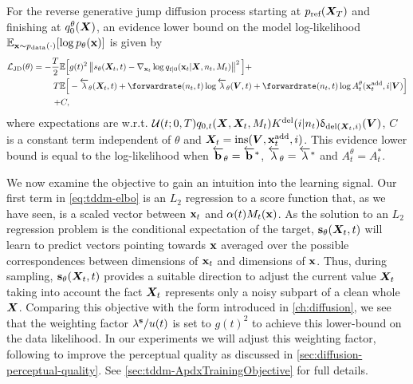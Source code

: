 \begin{proposition}
\label{prop:elbo}
For the reverse generative jump diffusion process starting at $p_{\textup{ref}}({\bm{X}}_T)$ and finishing at $ q_0^\theta({\bm{X}})$, an evidence lower bound on the model log-likelihood $ \mathbb{E}_{{\mathbf{x}} \sim p_{\rm{data}}(\cdot)} [ \log p_\theta({\mathbf{x}}) ]$ is given by
\begin{align}
    \label{eq:tddm-elbo}
    \mathcal{L}_\text{JD}(\theta) = -\frac{T}{2} \mathbb{E}\Big[& g(t)^2 \norm{s_\theta(\mX_t, t) - \nabla_{\rvx_t} \log q_{t|0}(\rvx_t | \mX, n_t, M_t)   }^2 \Big] + \\
    \nonumber
    T \mathbb{E} \Big[& - \backwardrate_\theta(\mX_t, t) + \forwardrate (n_t, t) \log \backwardrate_\theta(\mV, t) + \forwardrate(n_t, t) \log \autonet_{t}^\theta(\xadd_t, i | \mV) \Big] \\
    \nonumber
    + C,
\end{align}
where expectations are w.r.t. $\mathcal{U}(t; 0, T) q_{0,t}({\bm{X}}, {\bm{X}}_t, M_t) K^{\textup{del}}(i | n_t) \updelta_{\textup{del}({\bm{X}}_t, i)} ({\bm{V}})$, $C$ is a constant term independent of $\theta$ and ${\bm{X}}_t = \text{ins}({\bm{V}}, {\mathbf{x}}^{\textup{add}}_t, i)$.
This evidence lower bound is equal to the log-likelihood when $\overleftarrow{\mathbf{b}}_\theta = \overleftarrow{\mathbf{b}}^*$, $\overleftarrow{\lambda}_\theta = \overleftarrow{\lambda}^*$ and $A_t^\theta = A_t^*$.
\end{proposition}

We now examine the objective to gain an intuition into the learning signal.
Our first term in \cref{eq:tddm-elbo} is an $L_2$ regression to a score function that, as we have seen, is a scaled vector between ${\mathbf{x}}_t$ and $\alpha(t) M_t({\mathbf{x}})$. As the solution to an $L_2$ regression problem is the conditional expectation of the target, ${\mathbf{s}}_\theta({\bm{X}}_t, t)$ will learn to predict vectors pointing towards ${\mathbf{x}}$ averaged over the possible correspondences between dimensions of ${\mathbf{x}}_t$ and dimensions of ${\mathbf{x}}$.
Thus, during sampling, ${\mathbf{s}}_\theta({\bm{X}}_t, t)$ provides a suitable direction to adjust the current value ${\bm{X}}_t$ taking into account the fact ${\bm{X}}_t$ represents only a noisy subpart of a clean whole ${\bm{X}}$. Comparing this objective with the form introduced in \cref{ch:diffusion}, we see that the weighting factor $\lambda^{\mathbf{s}} / u(t)$ is set to $g(t)^2$ to achieve this lower-bound on the data likelihood. In our experiments we will adjust this weighting factor, following \citet{song2020score} to improve the perceptual quality as discussed in \cref{sec:diffusion-perceptual-quality}. See \cref{sec:tddm-ApdxTrainingObjective} for full details.

